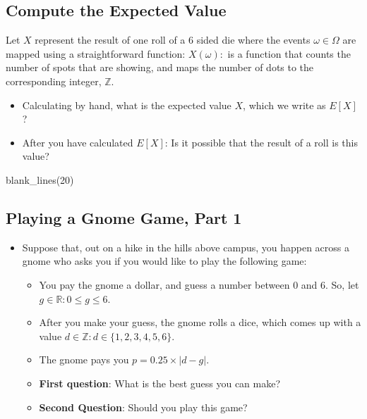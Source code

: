 \documentclass[
  letterpaper,
  DIV=11,
  numbers=noendperiod]{scrreprt}
\newenvironment{Shaded}{\begin{snugshade}}{\end{snugshade}}
\newcommand{\DecValTok}[1]{\textcolor[rgb]{0.68,0.00,0.00}{#1}}
\newcommand{\FunctionTok}[1]{\textcolor[rgb]{0.28,0.35,0.67}{#1}}
\newcommand{\NormalTok}[1]{\textcolor[rgb]{0.00,0.23,0.31}{#1}}
\providecommand{\tightlist}{%
  \setlength{\itemsep}{0pt}\setlength{\parskip}{0pt}}\usepackage{longtable,booktabs,array}
\begin{document}
\subsection{Compute the Expected
Value}\label{compute-the-expected-value}

Let \(X\) represent the result of one roll of a 6 sided die where the
events \(\omega \in \Omega\) are mapped using a straightforward
function: \(X(\omega):\) is a function that counts the number of spots
that are showing, and maps the number of dots to the corresponding
integer, \(\mathbb{Z}\).

\begin{itemize}
\tightlist
\item
  Calculating by hand, what is the expected value \(X\), which we write
  as \(E[X]\)?
\item
  After you have calculated \(E[X]\): Is it possible that the result of
  a roll is this value?
\end{itemize}

\begin{Shaded}
\begin{Highlighting}[]
\FunctionTok{blank\_lines}\NormalTok{(}\DecValTok{20}\NormalTok{)}
\end{Highlighting}
\end{Shaded}

\vspace{20cm}

\subsection{Playing a Gnome Game, Part
1}\label{playing-a-gnome-game-part-1}

\begin{itemize}
\tightlist
\item
  Suppose that, out on a hike in the hills above campus, you happen
  across a gnome who asks you if you would like to play the following
  game:

  \begin{itemize}
  \tightlist
  \item
    You pay the gnome a dollar, and guess a number between 0 and 6. So,
    let \(g \in \mathbb{R}: 0 \leq g \leq 6\).
  \item
    After you make your guess, the gnome rolls a dice, which comes up
    with a value \(d \in \mathbb{Z}: d \in \{1,2,3,4,5,6\}\).
  \item
    The gnome pays you \(p = 0.25 \times |d - g|\).
  \item
    \textbf{First question}: What is the best guess you can make?
  \item
    \textbf{Second Question}: Should you play this game?
  \end{itemize}
\end{itemize}
\end{document}
